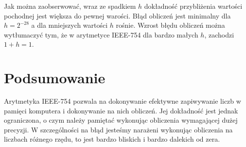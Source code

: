 \documentclass{article}
\begin{document}
Jak można zaobserwować, wraz ze spadkiem $h$ dokładność przybliżenia wartości pochodnej jest większa do pewnej warości.
Błąd obliczeń jest minimalny dla $h=2^{-28}$ a dla mniejszych wartości $h$ rośnie.
Wzrost błędu obliczeń można wytłumaczyć tym, że w arytmetyce IEEE-754 dla bardzo małych $h$, zachodzi $1+h = 1$.

\section{Podsumowanie}

Arytmetyka IEEE-754 pozwala na dokonywanie efektywne zapiwywanie liczb w pamięci komputera i dokonywanie na nich obliczeń.
Jej dokładność jest jednak ograniczona, o czym należy pamiętać wykonując obliczenia wymagającej dużej precyzji.
W szczególności na błąd jesteśmy narażeni wykonując obliczenia na liczbach różnego rzędu, to jest bardzo bliskich i bardzo dalekich od zera.
\end{document}

